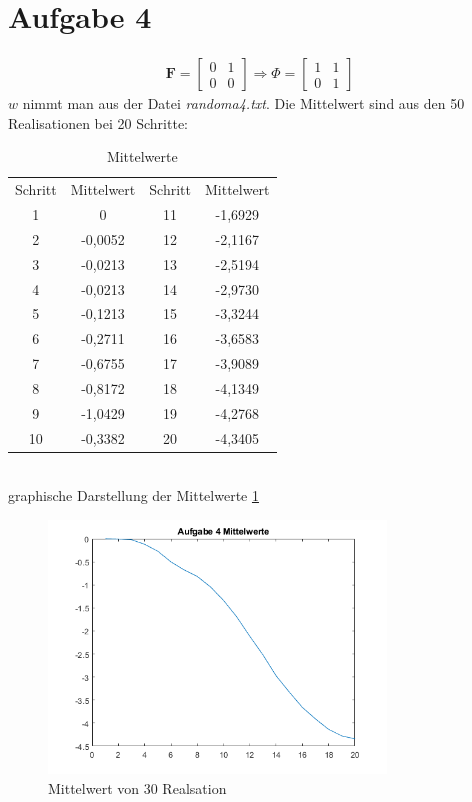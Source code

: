 \section{Aufgabe 4}
\begin{gather}
	\bm{F} = \begin{bmatrix}
	0 & 1 \\
	0 & 0 
	\end{bmatrix} \Longrightarrow \Phi = \begin{bmatrix}
	1 & 1 \\
	0 & 1
	\end{bmatrix}
\end{gather}
$w$ nimmt man aus der Datei \textit{randoma4.txt}. 
Die Mittelwert sind aus den 50 Realisationen bei 20 Schritte: 
\begin{table}[htpb] \centering
	\begin{tabular}{cccc}
		Schritt & Mittelwert & Schritt & Mittelwert \\
		1       & 0          & 11      & -1,6929    \\
		2       & -0,0052    & 12      & -2,1167    \\
		3       & -0,0213    & 13      & -2,5194    \\
		4       & -0,0213    & 14      & -2,9730    \\
		5       & -0,1213    & 15      & -3,3244    \\
		6       & -0,2711    & 16      & -3,6583    \\
		7       & -0,6755    & 17      & -3,9089    \\
		8       & -0,8172    & 18      & -4,1349    \\
		9       & -1,0429    & 19      & -4,2768    \\
		10      & -0,3382    & 20      & -4,3405   
	\end{tabular}
	\caption{Mittelwerte}
	\label{tab:mittelwert}
\end{table}\\
graphische Darstellung der Mittelwerte \ref{fig:mittel4}
\begin{figure}[htbp]
	\centering
	\includegraphics[width=0.8\textwidth]{images/4_mittelwerte} 
	\caption{Mittelwert von 30 Realsation} 
	\label{fig:mittel4}
\end{figure}\\
